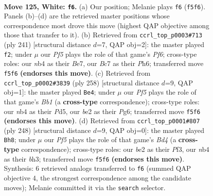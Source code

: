 \documentclass[11pt]{article}
\begin{document}
\clearpage

\begin{figure}[p]\centering
\begin{subfigure}{0.46\textwidth}\centering
\resizebox{\linewidth}{!}{%
\newchessgame
\chessboard[
  setfen={7k/2B5/6K1/5P2/1n6/8/4b3/8 w - - 7 125},
  showmover=false,
  pgfstyle=straightmove, color=movearrow, markmove={f5-f6}
]}
\caption{}
\end{subfigure}\hfill
\begin{subfigure}{0.46\textwidth}\centering
\resizebox{\linewidth}{!}{%
\newchessgame
\chessboard[
  setfen={8/4b3/7p/7P/2B5/5p2/3K2k1/8 b - - 7 121},
  showmover=false,
  pgfstyle=straightmove, color=movearrow, markmove={f3-f2}
]}
\caption{}
\end{subfigure}
\\[4pt]
\begin{subfigure}{0.46\textwidth}\centering
\resizebox{\linewidth}{!}{%
\newchessgame
\chessboard[
  setfen={8/4k1b1/6P1/3P1K2/8/8/8/1B6 w - - 19 130},
  showmover=false,
  pgfstyle=straightmove, color=movearrow, markmove={b1-e4}
]}
\caption{}
\end{subfigure}\hfill
\begin{subfigure}{0.46\textwidth}\centering
\resizebox{\linewidth}{!}{%
\newchessgame
\chessboard[
  setfen={8/5k2/8/8/3BP3/5P1b/5K2/8 w - - 73 125},
  showmover=false,
  pgfstyle=straightmove, color=movearrow, markmove={d4-h8}
]}
\caption{}
\end{subfigure}
\caption{\textbf{Move 125, White: \texttt{f6}.} (a) Our position; Melanie plays \texttt{f6} (\texttt{f5f6}). Panels (b)--(d) are the retrieved master positions whose correspondence most drove this move (highest QAP objective among those that transfer to it). (b) Retrieved from \texttt{ccrl\_top\_p0003\#713} (ply 241) [structural distance $d$=7, QAP obj=2]: the master played \texttt{f2}; under $\mu$ our \emph{Pf5} plays the role of that game's \emph{Pf6}; cross-type roles: our \emph{n}b4 as their \emph{B}e7, our \emph{B}c7 as their \emph{P}h6; transferred move \texttt{f5f6} \textbf{(endorses this move)}. (c) Retrieved from \texttt{ccrl\_top\_p0002\#3839} (ply 258) [structural distance $d$=9, QAP obj=1]: the master played \texttt{Be4}; under $\mu$ our \emph{Pf5} plays the role of that game's \emph{Bb1} (a \textbf{cross-type} correspondence); cross-type roles: our \emph{n}b4 as their \emph{P}d5, our \emph{b}e2 as their \emph{P}g6; transferred move \texttt{f5f6} \textbf{(endorses this move)}. (d) Retrieved from \texttt{ccrl\_top\_p0001\#807} (ply 248) [structural distance $d$=9, QAP obj=0]: the master played \texttt{Bh8}; under $\mu$ our \emph{Pf5} plays the role of that game's \emph{Bd4} (a \textbf{cross-type} correspondence); cross-type roles: our \emph{b}e2 as their \emph{P}f3, our \emph{n}b4 as their \emph{b}h3; transferred move \texttt{f5f6} \textbf{(endorses this move)}. Synthesis: 6 retrieved analogs transferred to \texttt{f6} (summed QAP objective 4, the strongest correspondence among the candidate moves); Melanie committed it via the \texttt{search} selector.}
\label{fig:thought-m248}
\end{figure}
\end{document}
